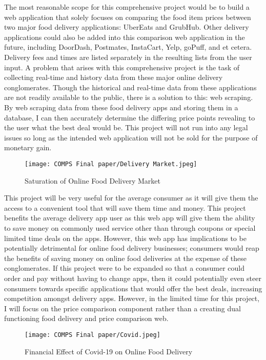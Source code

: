 \documentclass[10pt,twocolumn]{article}
\begin{document}
The most reasonable scope for this comprehensive project would be to build a web application that solely focuses on comparing the food item prices between two major food delivery applications: UberEats and GrubHub. Other delivery applications could also be added into this comparison web application in the future, including DoorDash, Postmates, InstaCart, Yelp, goPuff, and et cetera. Delivery fees and times are listed separately in the resulting lists from the user input. A problem that arises with this comprehensive project is the task of collecting real-time and history data from these major online delivery conglomerates. Though the historical and real-time data from these applications are not readily available to the public, there is a solution to this: web scraping. By web scraping data from these food delivery apps and storing them in a database, I can then accurately determine the differing price points revealing to the user what the best deal would be. This project will not run into any legal issues so long as the intended web application will not be sold for the purpose of monetary gain.

\begin{figure}
    \centering
    \texttt{[image: COMPS Final paper/Delivery Market.jpeg]}
    \caption{
        Saturation of Online Food Delivery Market
    }
    \label{fig:second-page}
\end{figure}

This project will be very useful for the average consumer as it will give them the access to a convenient tool that will save them time and money. This project benefits the average delivery app user as this web app will give them the ability to save money on commonly used service other than through coupons or special limited time deals on the apps. However, this web app has implications to be potentially detrimental for online food delivery businesses; consumers would reap the benefits of saving money on online food deliveries at the expense of these conglomerates. If this project were to be expanded so that a consumer could order and pay without having to change apps, then it could potentially even steer consumers towards specific applications that would offer the best deals, increasing competition amongst delivery apps. However, in the limited time for this project, I will focus on the price comparison component rather than a creating dual functioning food delivery and price comparison web.

\begin{figure}
    \centering
    \texttt{[image: COMPS Final paper/Covid.jpeg]}
    \caption{
        Financial Effect of Covid-19 on Online Food Delivery
    }
    \label{fig:second-page-1}
\end{figure}  
\end{document}
